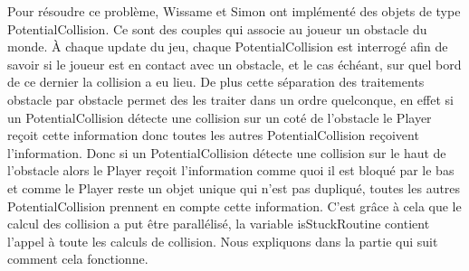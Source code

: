 
Pour résoudre ce problème, Wissame et Simon ont implémenté des objets de type PotentialCollision.
Ce sont des couples qui associe au joueur un obstacle du monde. À chaque update du jeu, chaque PotentialCollision est interrogé afin de savoir si le joueur est en contact avec un obstacle, et le cas échéant, sur quel bord de ce dernier la collision a eu lieu.
\ml
De plus cette séparation des traitements obstacle par obstacle permet des les traiter dans un ordre quelconque, en effet si un PotentialCollision détecte une collision sur un coté de l'obstacle le Player reçoit cette information donc toutes les autres PotentialCollision reçoivent l'information. 
\ml
Donc si un PotentialCollision détecte une collision sur le haut de l'obstacle alors le Player reçoit l'information comme quoi il est bloqué par le bas et comme le Player reste un objet unique qui n'est pas dupliqué, toutes les autres PotentialCollision prennent en compte cette information.
\ml
C'est grâce à cela que le calcul des collision a put être parallélisé, la variable isStuckRoutine contient l'appel à toute les calculs de collision. Nous expliquons dans la partie qui suit comment cela fonctionne.